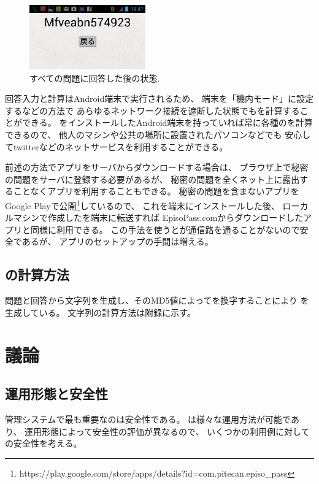 \documentclass[twoside]{wiss}
\begin{document}
\begin{figure}[H]
\centerline{\includegraphics[width=50mm,bb=0 0 720 400]{figures/android3crop.png}}
\caption{すべての問題に回答した後の状態.}
\label{android3}
\end{figure}

回答入力と{\PW}計算はAndroid端末で実行されるため、
端末を「機内モード」に設定するなどの方法で
あらゆるネットワーク接続を遮断した状態でも{\PW}を計算することができる。
{\EP}をインストールしたAndroid端末を持っていれば常に各種の{\PW}を計算できるので、
他人のマシンや公共の場所に設置されたパソコンなどでも
安心してtwitterなどのネットサービスを利用することができる。

前述の方法で{\EP}アプリをサーバからダウンロードする場合は、
ブラウザ上で秘密の問題をサーバに登録する必要があるが、
秘密の問題を全くネット上に露出することなくアプリを利用することもできる。
秘密の問題を含まない{\EP}アプリをGoogle Playで公開\footnote{
 {\textsf{https://play.google.com/{\allowbreak}store/{\allowbreak}apps/{\allowbreak}details?{\allowbreak}id=com.{\allowbreak}pitecan.{\allowbreak}episo\_pass}}
}しているので、
これを端末にインストールした後、
ローカルマシンで作成した{\SQ}を端末に転送すれば
EpisoPass.comからダウンロードしたアプリと同様に利用できる。
この手法を使うと{\SQ}が通信路を通ることがないので安全であるが、
アプリのセットアップの手間は増える。

\subsection{{\PW}の計算方法}

問題と回答から文字列を生成し、そのMD5値によって{\SS}を換字することにより
{\PW}を生成している。
{\PW}文字列の計算方法は附録に示す。

\section{議論}

\subsection{運用形態と安全性}

{\PW}管理システムで最も重要なのは安全性である。
%
{\EP}は様々な運用方法が可能であり、
運用形態によって安全性の評価が異なるので、
いくつかの利用例に対して{\EP}の安全性を考える。
\end{document}
